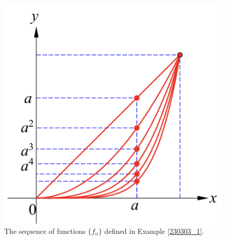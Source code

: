  
\begin{figure}[ht]
\centering
\includegraphics[scale=0.2]{Picture52.png}
\caption{The sequence of functions $\{f_n\}$ defined in Example \ref{230303_1}.\fa}\label{figure52}
\end{figure}


